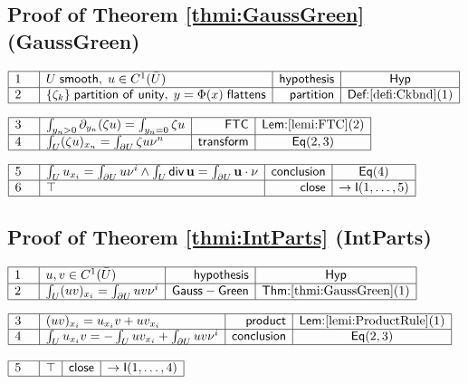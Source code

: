 \documentclass[11pt,reqno]{amsart}
\begin{document}
	\subsection*{Proof of Theorem \protect\ref{thmi:GaussGreen} (\textsf{GaussGreen})}
	\noindent$\begin{array}{|m{0.5cm}|l|r|c|}
	\hline
	1 & U\;\mathsf{smooth},\;u\in C^{1}(\bar{U}) & \mathsf{hypothesis} & \mathsf{Hyp} \\ \hline
	2 & \{\zeta_{k}\}\;\mathsf{partition\ of\ unity},\;y=\Phi(x)\;\mathsf{flattens} & \mathsf{partition} & \textsf{Def:}\ref{defi:Ckbnd}(1) \\ \hline
	\end{array}$
	\par\nointerlineskip\noindent$\begin{array}{|m{0.5cm}|l|r|c|}
	\hline
	3 & \int_{y_{n}>0}\partial_{y_{n}}(\zeta u)=\int_{y_{n}=0}\zeta u & \mathsf{FTC} & \textsf{Lem:}\ref{lemi:FTC}(2) \\ \hline
	4 & \int_{U}(\zeta u)_{x_{n}}=\int_{\partial U}\zeta u\nu^{n} & \mathsf{transform} & \mathsf{Eq}(2,3) \\ \hline
	\end{array}$
	\par\nointerlineskip\noindent$\begin{array}{|m{0.5cm}|l|r|c|}
	\hline
	5 & \int_{U}u_{x_{i}}=\int_{\partial U}u\nu^{i}\wedge\int_{U}\mathsf{div}\,\mathbf{u}=\int_{\partial U}\mathbf{u}\cdot\nu & \mathsf{conclusion} & \mathsf{Eq}(4) \\ \hline
	6 & \top & \mathsf{close} & \to\mathsf{I}(1,\dots,5) \\ \hline
	\end{array}$
	\medskip
	
	\subsection*{Proof of Theorem \protect\ref{thmi:IntParts} (\textsf{IntParts})}
	\noindent$\begin{array}{|m{0.5cm}|l|r|c|}
	\hline
	1 & u,v\in C^{1}(\bar{U}) & \mathsf{hypothesis} & \mathsf{Hyp} \\ \hline
	2 & \int_{U}(uv)_{x_{i}}=\int_{\partial U}uv\nu^{i} & \mathsf{Gauss-Green} & \textsf{Thm:}\ref{thmi:GaussGreen}(1) \\ \hline
	\end{array}$
	\par\nointerlineskip\noindent$\begin{array}{|m{0.5cm}|l|r|c|}
	\hline
	3 & (uv)_{x_{i}}=u_{x_{i}}v+uv_{x_{i}} & \mathsf{product} & \textsf{Lem:}\ref{lemi:ProductRule}(1) \\ \hline
	4 & \int_{U}u_{x_{i}}v=-\int_{U}uv_{x_{i}}+\int_{\partial U}uv\nu^{i} & \mathsf{conclusion} & \mathsf{Eq}(2,3) \\ \hline
	\end{array}$
	\par\nointerlineskip\noindent$\begin{array}{|m{0.5cm}|l|r|c|}
	\hline
	5 & \top & \mathsf{close} & \to\mathsf{I}(1,\dots,4) \\ \hline
	\end{array}$
	\medskip
	
\end{document}
